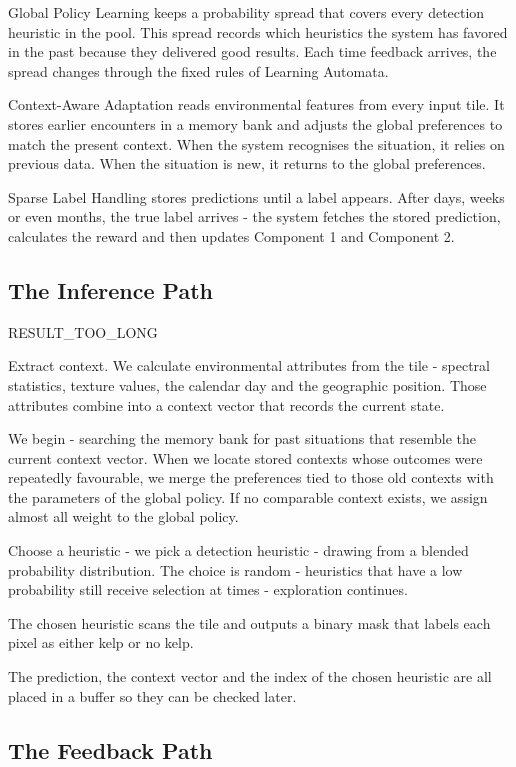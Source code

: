 \documentclass[11pt,a4paper]{article}
\begin{document}
Global Policy Learning keeps a probability spread that covers every detection heuristic in the pool. This spread records which heuristics the system has favored in the past because they delivered good results. Each time feedback arrives, the spread changes through the fixed rules of Learning Automata.

Context-Aware Adaptation reads environmental features from every input tile. It stores earlier encounters in a memory bank and adjusts the global preferences to match the present context. When the system recognises the situation, it relies on previous data. When the situation is new, it returns to the global preferences.

Sparse Label Handling stores predictions until a label appears. After days, weeks or even months, the true label arrives - the system fetches the stored prediction, calculates the reward and then updates Component 1 and Component 2.

\subsection{The Inference Path}

RESULT_TOO_LONG

Extract context. 
We calculate environmental attributes from the tile - spectral statistics, texture values, the calendar day and the geographic position. Those attributes combine into a context vector that records the current state.

We begin - searching the memory bank for past situations that resemble the current context vector. When we locate stored contexts whose outcomes were repeatedly favourable, we merge the preferences tied to those old contexts with the parameters of the global policy. If no comparable context exists, we assign almost all weight to the global policy.

Choose a heuristic - we pick a detection heuristic - drawing from a blended probability distribution. The choice is random - heuristics that have a low probability still receive selection at times - exploration continues.

The chosen heuristic scans the tile and outputs a binary mask that labels each pixel as either kelp or no kelp.

The prediction, the context vector and the index of the chosen heuristic are all placed in a buffer so they can be checked later.

\subsection{The Feedback Path}
\end{document}
